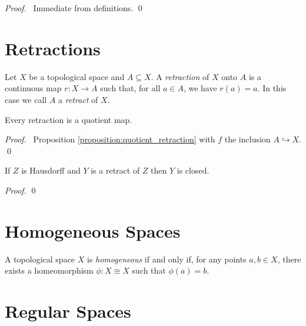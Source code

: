 \begin{proof}
    \pf\ Immediate from definitions. \qed
\end{proof}

\section{Retractions}

\begin{definition}[Retraction]
    Let $X$ be a topological space and $A \subseteq X$. A \emph{retraction} of $X$ onto $A$ is a continuous map $r : X \rightarrow A$ such that, for all $a \in A$,
    we have $r(a) = a$. In this case we call $A$ a \emph{retract} of $X$.
\end{definition}

\begin{proposition}
    Every retraction is a quotient map.
\end{proposition}

\begin{proof}
    \pf\ Proposition \ref{proposition:quotient_retraction} with $f$ the inclusion $A \hookrightarrow X$. \qed
\end{proof}

\begin{proposition}
    If $Z$ is Hausdorff and $Y$ is a retract of $Z$ then $Y$ is closed.
\end{proposition}

\begin{proof}
    \pf
    \qed
\end{proof}

\section{Homogeneous Spaces}

\begin{definition}[Homogeneous]
    A topological space $X$ is \emph{homogeneous} if and only if, for any
    points $a, b \in X$, there exists a homeomorphism $\phi : X \cong X$
    such that $\phi(a) = b$.
\end{definition}

\section{Regular Spaces}


